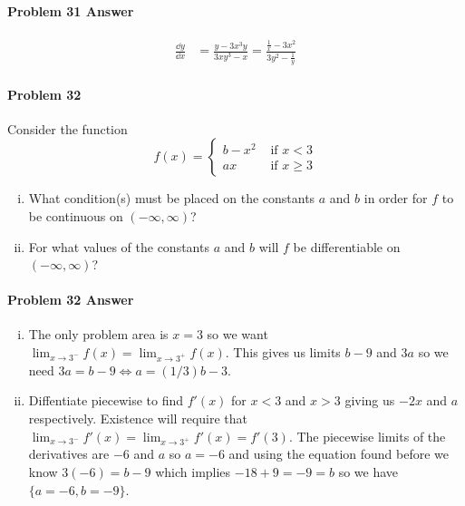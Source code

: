 \documentclass[a4paper, 11pt]{article}
\begin{document}
\paragraph{Problem 31 Answer}
\begin{align}
    \frac{\dd y}{\dd x} &= \frac{y - 3x^3 y}{3xy^3-x} = \frac{\frac{1}{x}-3x^2}{3y^2-\frac{1}{y}}  \nonumber
\end{align}


\paragraph{Problem 32}
Consider the function
\[
	f(x) = \begin{cases}
				b-x^2 & \text{ if } x < 3 \\
				ax & \text{ if } x \geq 3
	 	   \end{cases}
\]
\begin{enumerate}[(i)]
	\item What condition(s) must be placed on the constants $a$ and $b$ in order for $f$ to be continuous on $(-\infty, \infty)$?
	\item For what values of the constants $a$ and $b$ will $f$ be differentiable on $(-\infty, \infty)$?
\end{enumerate}


\paragraph{Problem 32 Answer}
\begin{enumerate}[(i)]
	\item The only problem area is $x=3$ so we want $\lim_{x \rightarrow 3^-} f(x) = \lim_{x\rightarrow 3^+} f(x)$.
	This gives us limits $b-9$ and $3a$ so we need $3a=b-9 \iff a = (1/3)b - 3$.
	\item Diffentiate piecewise to find $f'(x)$ for $x < 3$ and $x > 3$ giving us $-2x$ and $a$ respectively.
	Existence will require that $\lim_{x\rightarrow 3^-} f'(x) = \lim_{x\rightarrow 3^+} f'(x) = f'(3)$.
	The piecewise limits of the derivatives are $-6$ and $a$ so $a=-6$ and using the equation found before we know $3(-6) = b-9$ which implies $-18 + 9 = -9 = b$ so we have $\{a=-6, b=-9\}$.
\end{enumerate}
\end{document}
